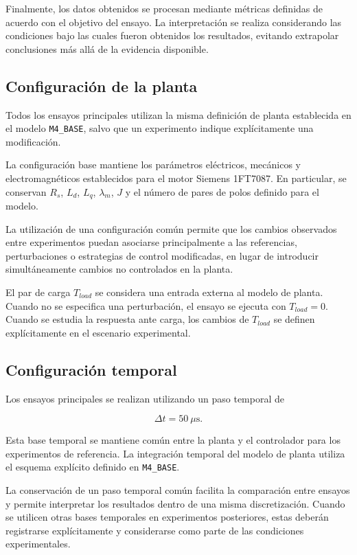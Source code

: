 Finalmente, los datos obtenidos se procesan mediante métricas definidas de acuerdo con el objetivo del ensayo. La interpretación se realiza considerando las condiciones bajo las cuales fueron obtenidos los resultados, evitando extrapolar conclusiones más allá de la evidencia disponible.

\subsection{Configuración de la planta}

Todos los ensayos principales utilizan la misma definición de planta establecida en el modelo \texttt{M4\_BASE}, salvo que un experimento indique explícitamente una modificación.

La configuración base mantiene los parámetros eléctricos, mecánicos y electromagnéticos establecidos para el motor Siemens 1FT7087. En particular, se conservan \(R_s\), \(L_d\), \(L_q\), \(\lambda_m\), \(J\) y el número de pares de polos definido para el modelo.

La utilización de una configuración común permite que los cambios observados entre experimentos puedan asociarse principalmente a las referencias, perturbaciones o estrategias de control modificadas, en lugar de introducir simultáneamente cambios no controlados en la planta.

El par de carga \(T_{load}\) se considera una entrada externa al modelo de planta. Cuando no se especifica una perturbación, el ensayo se ejecuta con \(T_{load}=0\). Cuando se estudia la respuesta ante carga, los cambios de \(T_{load}\) se definen explícitamente en el escenario experimental.

\subsection{Configuración temporal}

Los ensayos principales se realizan utilizando un paso temporal de

\begin{equation}
\Delta t = 50~\mu\mathrm{s}.
\end{equation}

Esta base temporal se mantiene común entre la planta y el controlador para los experimentos de referencia. La integración temporal del modelo de planta utiliza el esquema explícito definido en \texttt{M4\_BASE}.

La conservación de un paso temporal común facilita la comparación entre ensayos y permite interpretar los resultados dentro de una misma discretización. Cuando se utilicen otras bases temporales en experimentos posteriores, estas deberán registrarse explícitamente y considerarse como parte de las condiciones experimentales.

